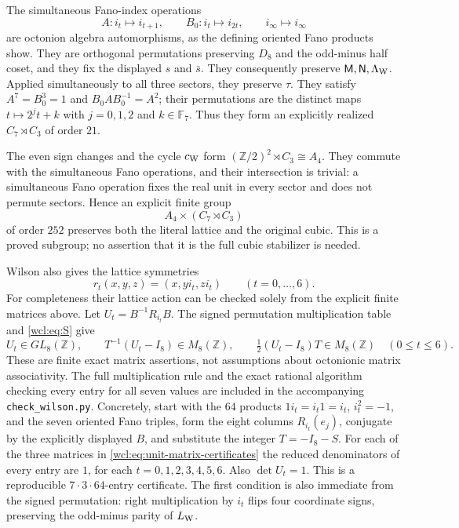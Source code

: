 The simultaneous Fano-index operations
\[
 A:i_t\longmapsto i_{t+1},\qquad
 B_0:i_t\longmapsto i_{2t},\qquad i_\infty\longmapsto i_\infty
\]
are octonion algebra automorphisms, as the defining oriented Fano
products show. They are orthogonal permutations preserving $D_8$ and
the odd-minus half coset, and they fix the displayed $s$ and $\bar s$.
They consequently preserve $\mathsf M,\mathsf N,\Lambda_{\rm W}$.
Applied simultaneously to all three sectors, they preserve $\tau$.
They satisfy $A^7=B_0^3=1$ and $B_0AB_0^{-1}=A^2$; their permutations
are the distinct maps $t\mapsto 2^j t+k$ with $j=0,1,2$ and
$k\in\mathbb F_7$. Thus they form an explicitly realized
$C_7\rtimes C_3$ of order $21$.

The even sign changes and the cycle $c_{\rm W}$ form
$(\mathbb Z/2)^2\rtimes C_3\cong A_4$. They commute with the
simultaneous Fano operations, and their intersection is trivial:
a simultaneous Fano operation fixes the real unit in every sector
and does not permute sectors. Hence an explicit finite group
\[
 A_4\times(C_7\rtimes C_3)
\]
of order $252$ preserves both the literal lattice and the original
cubic. This is a proved subgroup; no assertion that it is the full
cubic stabilizer is needed.

Wilson also gives the lattice symmetries
\[
 r_t(x,y,z)=(x,yi_t,zi_t)\qquad(t=0,\ldots,6).
\]
For completeness their lattice action can be checked solely from
the explicit finite matrices above. Let
$U_t=B^{-1}R_{i_t}B$. The signed permutation multiplication table
and \eqref{wcl:eq:S} give
\begin{equation}
 U_t\in GL_8(\mathbb Z),\qquad
 T^{-1}(U_t-I_8)\in M_8(\mathbb Z),\qquad
 \tfrac12(U_t-I_8)T\in M_8(\mathbb Z)
 \quad(0\le t\le6).
 \label{wcl:eq:unit-matrix-certificates}
\end{equation}
These are finite exact matrix assertions, not assumptions about
octonionic matrix associativity. The full multiplication rule and
the exact rational algorithm checking every entry for all seven
values are included in the accompanying \texttt{check\_wilson.py}.
Concretely, start with the $64$ products
$1i_t=i_t1=i_t$, $i_t^2=-1$, and the seven oriented Fano triples,
form the eight columns $R_{i_t}(e_j)$, conjugate by the explicitly
displayed $B$, and substitute the integer $T=-I_8-S$.
For each of the three matrices in \eqref{wcl:eq:unit-matrix-certificates}
the reduced denominators of every entry are $1$, for each
$t=0,1,2,3,4,5,6$. Also $\det U_t=1$.
This is a reproducible $7\cdot3\cdot64$-entry certificate.
The first condition is also immediate from the signed permutation:
right multiplication by $i_t$ flips four coordinate signs, preserving
the odd-minus parity of $L_{\rm W}$.

